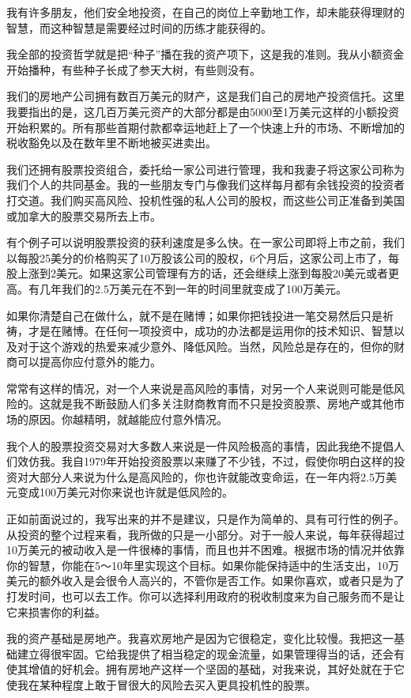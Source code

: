 我有许多朋友，他们安全地投资，在自己的岗位上辛勤地工作，却未能获得理财的智慧，而这种智慧是需要经过时间的历练才能获得的。

我全部的投资哲学就是把“种子”播在我的资产项下，这是我的准则。我从小额资金开始播种，有些种子长成了参天大树，有些则没有。

我们的房地产公司拥有数百万美元的财产，这是我们自己的房地产投资信托。这里我要指出的是，这几百万美元资产的大部分都是由5000至1万美元这样的小额投资开始积累的。所有那些首期付款都幸运地赶上了一个快速上升的市场、不断增加的税收豁免以及在数年里不断地被买进卖出。

我们还拥有股票投资组合，委托给一家公司进行管理，我和我妻子将这家公司称为我们个人的共同基金。我的一些朋友专门与像我们这样每月都有余钱投资的投资者打交道。我们购买高风险、投机性强的私人公司的股权，而这些公司正准备到美国或加拿大的股票交易所去上市。

有个例子可以说明股票投资的获利速度是多么快。在一家公司即将上市之前，我们以每股25美分的价格购买了10万股该公司的股权，6个月后，这家公司上市了，每股上涨到2美元。如果这家公司管理有方的话，还会继续上涨到每股20美元或者更高。有几年我们的2.5万美元在不到一年的时间里就变成了100万美元。

如果你清楚自己在做什么，就不是在赌博；如果你把钱投进一笔交易然后只是祈祷，才是在赌博。在任何一项投资中，成功的办法都是运用你的技术知识、智慧以及对于这个游戏的热爱来减少意外、降低风险。当然，风险总是存在的，但你的财商可以提高你应付意外的能力。

常常有这样的情况，对一个人来说是高风险的事情，对另一个人来说则可能是低风险的。这就是我不断鼓励人们多关注财商教育而不只是投资股票、房地产或其他市场的原因。你越精明，就越能应付意外情况。

我个人的股票投资交易对大多数人来说是一件风险极高的事情，因此我绝不提倡人们效仿我。我自1979年开始投资股票以来赚了不少钱，不过，假使你明白这样的投资对大部分人来说为什么是高风险的，你也许就能改变命运，在一年内将2.5万美元变成100万美元对你来说也许就是低风险的。

正如前面说过的，我写出来的并不是建议，只是作为简单的、具有可行性的例子。从投资的整个过程来看，我所做的只是一小部分。对于一般人来说，每年获得超过10万美元的被动收入是一件很棒的事情，而且也并不困难。根据市场的情况并依靠你的智慧，你能在5～10年里实现这个目标。如果你能保持适中的生活支出，10万美元的额外收入是会很令人高兴的，不管你是否工作。如果你喜欢，或者只是为了打发时间，也可以去工作。你可以选择利用政府的税收制度来为自己服务而不是让它来损害你的利益。

我的资产基础是房地产。我喜欢房地产是因为它很稳定，变化比较慢。我把这一基础建立得很牢固。它给我提供了相当稳定的现金流量，如果管理得当的话，还会有使其增值的好机会。拥有房地产这样一个坚固的基础，对我来说，其好处就在于它使我在某种程度上敢于冒很大的风险去买入更具投机性的股票。


